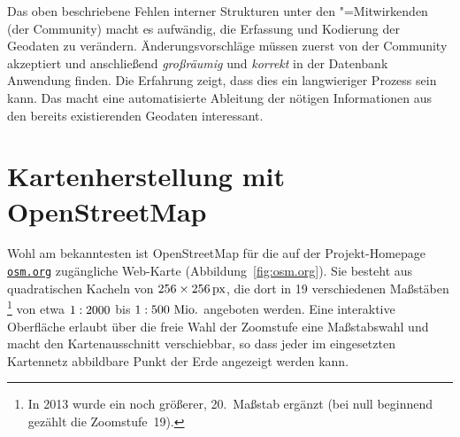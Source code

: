 \documentclass[../main/thesis.tex]{subfiles}
\begin{document}
Das oben beschriebene Fehlen interner Strukturen unter den \osm"=Mitwirkenden (der Community) macht es aufwändig, die Erfassung und Kodierung der Geodaten zu verändern. 
Änderungsvorschläge müssen zuerst von der Community akzeptiert und anschließend \emph{großräumig} und \emph{korrekt} in der Datenbank Anwendung finden.
Die Erfahrung zeigt, dass dies ein langwieriger Prozess sein kann.
Das macht eine automatisierte Ableitung der nötigen Informationen aus den bereits existierenden Geodaten interessant.



\section{Kartenherstellung mit OpenStreetMap} \label{kartenherstellung}

Wohl am bekanntesten ist OpenStreetMap für die auf der Projekt-Homepage \href{https://www.openstreetmap.org/}{\nolinkurl{osm.org}} zugängliche Web-Karte (Abbildung~\ref{fig:osm.org}).
Sie besteht aus quadratischen Kacheln  von $256\times\unit[256]{px}$, die dort in 19 verschiedenen Maßstäben%
\footnote{In 2013 wurde ein noch größerer, 20.~Maßstab ergänzt (bei null beginnend gezählt  die Zoomstufe~19).}
von etwa $1 \nobreak : \nobreak 2000$ bis $1 \nobreak : \nobreak 500~\unit{Mio.}$ angeboten werden. 
Eine interaktive Oberfläche erlaubt über die freie Wahl der Zoomstufe eine Maßstabswahl und macht den Kartenausschnitt verschiebbar, so dass jeder im eingesetzten Kartennetz abbildbare Punkt der Erde angezeigt werden kann.

\end{document}
